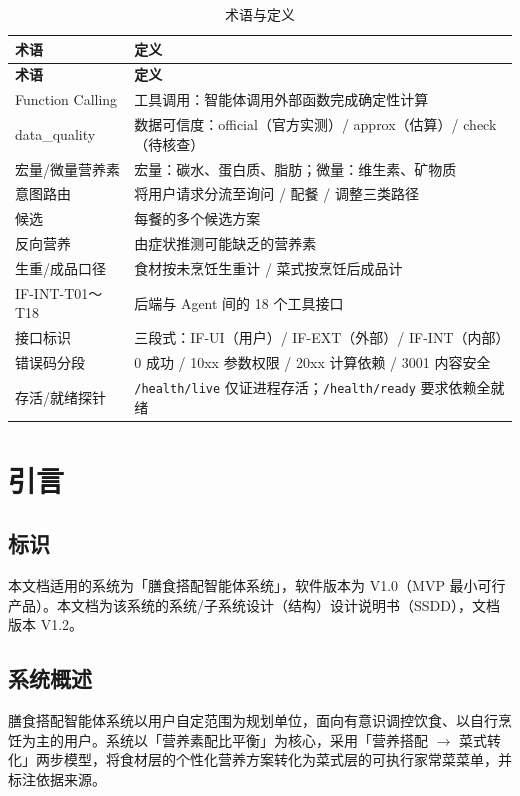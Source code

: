 \documentclass[12pt,a4paper]{ctexart}
\begin{document}
\begin{xltabular}{\linewidth}{p{3.2cm}L}
\caption{术语与定义\label{tab:glossary-term}} \\
\toprule
\textbf{术语} & \textbf{定义} \\
\midrule
\endfirsthead
\toprule
\textbf{术语} & \textbf{定义} \\
\midrule
\endhead
Function Calling & 工具调用：智能体调用外部函数完成确定性计算 \\
data\_quality & 数据可信度：official（官方实测）/ approx（估算）/ check（待核查） \\
宏量/微量营养素 & 宏量：碳水、蛋白质、脂肪；微量：维生素、矿物质 \\
意图路由 & 将用户请求分流至询问 / 配餐 / 调整三类路径 \\
候选 & 每餐的多个候选方案 \\
反向营养 & 由症状推测可能缺乏的营养素 \\
生重/成品口径 & 食材按未烹饪生重计 / 菜式按烹饪后成品计 \\
IF-INT-T01～T18 & 后端与 Agent 间的 18 个工具接口 \\
接口标识 & 三段式：IF-UI（用户）/ IF-EXT（外部）/ IF-INT（内部） \\
错误码分段 & 0 成功 / 10xx 参数权限 / 20xx 计算依赖 / 3001 内容安全 \\
存活/就绪探针 & \texttt{/health/live} 仅证进程存活；\texttt{/health/ready} 要求依赖全就绪 \\
\bottomrule
\end{xltabular}

\section{引言}

\subsection{标识}

本文档适用的系统为「膳食搭配智能体系统」，软件版本为 V1.0（MVP 最小可行产品）。本文档为该系统的系统/子系统设计（结构）设计说明书（SSDD），文档版本 V1.2。

\subsection{系统概述}

膳食搭配智能体系统以用户自定范围为规划单位，面向有意识调控饮食、以自行烹饪为主的用户。系统以「营养素配比平衡」为核心，采用「营养搭配 $\rightarrow$ 菜式转化」两步模型，将食材层的个性化营养方案转化为菜式层的可执行家常菜菜单，并标注依据来源。
\end{document}
